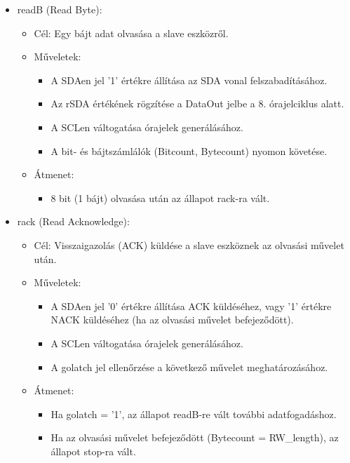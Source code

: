 \documentclass[a4paper,12pt,oneside]{book}
\begin{document}
\begin{itemize}
\begin{itemize}
    \end{itemize}
    \item readB (Read Byte):
    \begin{itemize}
        \item Cél: Egy bájt adat olvasása a slave eszközről.
        \item Műveletek:
        \begin{itemize}
            \item A SDAen jel '1' értékre állítása az SDA vonal felszabadításához.
            \item Az rSDA értékének rögzítése a DataOut jelbe a 8. órajelciklus alatt.
            \item A SCLen váltogatása órajelek generálásához.
            \item A bit- és bájtszámlálók (Bitcount, Bytecount) nyomon követése.
        \end{itemize}
        \item Átmenet:
        \begin{itemize}
            \item 8 bit (1 bájt) olvasása után az állapot rack-ra vált.
        \end{itemize}
    \end{itemize}
    \item rack (Read Acknowledge):
    \begin{itemize}
        \item Cél: Visszaigazolás (ACK) küldése a slave eszköznek az olvasási művelet után.
        \item Műveletek:
        \begin{itemize}
            \item A SDAen jel '0' értékre állítása ACK küldéséhez, vagy '1' értékre NACK küldéséhez (ha az olvasási művelet befejeződött).
            \item A SCLen váltogatása órajelek generálásához.
            \item A golatch jel ellenőrzése a következő művelet meghatározásához.
        \end{itemize}
        \item Átmenet:
        \begin{itemize}
            \item Ha golatch = '1', az állapot readB-re vált további adatfogadáshoz.
            \item Ha az olvasási művelet befejeződött (Bytecount = RW\_length), az állapot stop-ra vált.
        \end{itemize}

\end{itemize}
\end{itemize}
\end{document}
